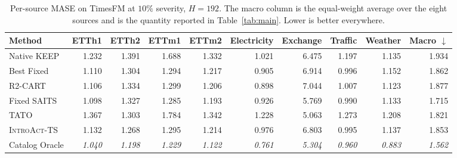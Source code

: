 \documentclass{article}
\newcommand{\oracle}[1]{\textit{\textcolor{phgray}{#1}}}
\newcommand{\introact}{\textsc{IntroAct-TS}}
\begin{document}
\begin{table}[htbp]
  \caption{Per-source MASE on TimesFM at $10\%$ severity, $H=192$. The macro column is the
  equal-weight average over the eight sources and is the quantity reported in
  Table~\ref{tab:main}. Lower is better everywhere.}
  \label{tab:app-src-tf-192}
  \centering
  \small
  \setlength{\tabcolsep}{3pt}
\begin{tabular*}{\textwidth}{@{\extracolsep{\fill}}lrrrrrrrrr@{}}
    \toprule
    Method & ETTh1 & ETTh2 & ETTm1 & ETTm2 & Electricity & Exchange & Traffic & Weather & Macro $\downarrow$ \\
    \midrule
    Native KEEP & 1.232 & 1.391 & 1.688 & 1.332 & 1.021 & 6.475 & 1.197 & 1.135 & 1.934 \\
    Best Fixed & 1.110 & 1.304 & 1.294 & 1.217 & 0.905 & 6.914 & 0.996 & 1.152 & 1.862 \\
    R2-CART & 1.106 & 1.334 & 1.299 & 1.206 & 0.898 & 7.044 & 1.007 & 1.123 & 1.877 \\
    Fixed SAITS & 1.098 & 1.327 & 1.285 & 1.193 & 0.926 & 5.769 & 0.990 & 1.133 & 1.715 \\
    TATO & 1.367 & 1.303 & 1.784 & 1.342 & 1.228 & 5.063 & 1.273 & 1.208 & 1.821 \\
    \midrule
    \rowcolor{bestgray}\introact{} & 1.132 & 1.268 & 1.295 & 1.214 & 0.976 & 6.803 & 0.995 & 1.137 & 1.853 \\
    \midrule
    Catalog Oracle & \oracle{1.040} & \oracle{1.198} & \oracle{1.229} & \oracle{1.122} & \oracle{0.761} & \oracle{5.304} & \oracle{0.960} & \oracle{0.883} & \oracle{1.562} \\
    \bottomrule
  \end{tabular*}
\end{table}
\end{document}

